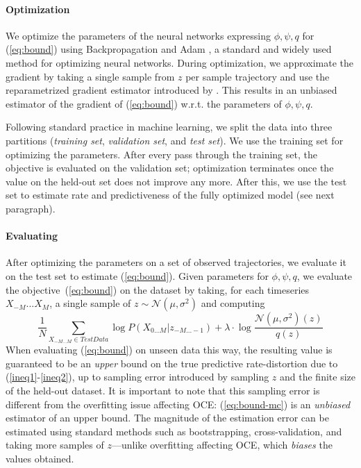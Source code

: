 \documentclass[11pt,letterpaper]{article}
\begin{document}
\paragraph{Optimization}
We optimize the parameters of the neural networks expressing $\phi, \psi, q$ for (\ref{eq:bound}) using Backpropagation and Adam \citep{kingma-adam:-2014}, a standard and widely used method for optimizing neural networks.
During optimization, we approximate the gradient by taking a single sample from $z$ per sample trajectory and use the reparametrized gradient estimator introduced by \citet{kingma-auto-encoding-2014}.
This results in an unbiased estimator of the gradient of (\ref{eq:bound}) w.r.t. the parameters of $\phi, \psi, q$.

Following standard practice in machine learning, we split the data into three partitions (\emph{training set}, \emph{validation set}, and \emph{test set}).
We use the training set for optimizing the parameters.
After every pass through the training set, the objective is evaluated on the validation set; optimization terminates once the value on the held-out set does not improve any more.
After this, we use the test set to estimate rate and predictiveness of the fully optimized model (see next paragraph).


\paragraph{Evaluating}
After optimizing the parameters on a set of observed trajectories, we evaluate it on the test set to estimate (\ref{eq:bound}).
Given parameters for $\phi, \psi, q$, we evaluate the objective~(\ref{eq:bound}) on the dataset by taking, for each timeseries $X_{-M}...X_M$, a single sample of $z  \sim \mathcal{N}(\mu, \sigma^2)$ and computing
\begin{equation}\label{eq:bound-mc}
	\frac{1}{N}	\sum_{X_{-M...M} \in TestData}	\log P(X_{0\dots M} | z_{-M...-1}) + \lambda \cdot \log \frac{\mathcal{N}(\mu, \sigma^2)(z)}{q(z)}
\end{equation}
When evaluating (\ref{eq:bound}) on unseen data this way, the resulting value is guaranteed to be an \emph{upper} bound on the true predictive rate-distortion due to (\ref{ineq1}-\ref{ineq2}), up to sampling error introduced by sampling $z$ and the finite size of the held-out dataset.
It is important to note that this sampling error is different from the overfitting issue affecting OCE: 
(\ref{eq:bound-mc}) is an \emph{unbiased} estimator of an upper bound.
The magnitude of the estimation error can be estimated using standard methods such as bootstrapping, cross-validation, and taking more samples of $z$---unlike overfitting affecting OCE, which \emph{biases} the values obtained.
\end{document}
